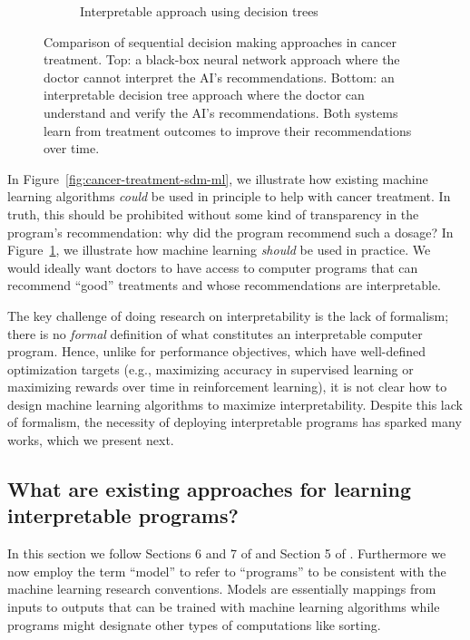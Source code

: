 \begin{figure}[htbp]
\begin{subfigure}[b]{0.7\textwidth}
\begin{tikzpicture}
        \end{tikzpicture}
        \caption{Interpretable approach using decision trees}
        \label{fig:cancer-treatment-comparison}
    \end{subfigure}
    \caption{Comparison of sequential decision making approaches in cancer treatment. Top: a black-box neural network approach where the doctor cannot interpret the AI's recommendations. Bottom: an interpretable decision tree approach where the doctor can understand and verify the AI's recommendations. Both systems learn from treatment outcomes to improve their recommendations over time.}
    \label{fig:cancer-treatment-comparison-combined}
\end{figure}

In Figure~\ref{fig:cancer-treatment-sdm-ml}, we illustrate how existing machine learning algorithms \textit{could} be used in principle to help with cancer treatment. In truth, this should be prohibited without some kind of transparency in the program's recommendation: why did the program recommend such a dosage?
In Figure~\ref{fig:cancer-treatment-comparison}, we illustrate how machine learning \textit{should} be used in practice. We would ideally want doctors to have access to computer programs that can recommend ``good'' treatments and whose recommendations are interpretable. 

The key challenge of doing research on interpretability is the lack of formalism; there is no \textit{formal} definition of what constitutes an interpretable computer program. Hence, unlike for performance objectives, which have well-defined optimization targets (e.g., maximizing accuracy in supervised learning or maximizing rewards over time in reinforcement learning), it is not clear how to design machine learning algorithms to maximize interpretability. 
Despite this lack of formalism, the necessity of deploying interpretable programs has sparked many works, which we present next.
\subsection{What are existing approaches for learning interpretable programs?}

In this section we follow Sections 6 and 7 of \cite{glanois-survey} and Section 5 of \cite{milani-survey}. 
Furthermore we now employ the term ``model'' to refer to ``programs'' to be consistent with the machine learning research conventions.
Models are essentially mappings from inputs to outputs that can be trained with machine learning algorithms while programs might designate other types of computations like sorting.

